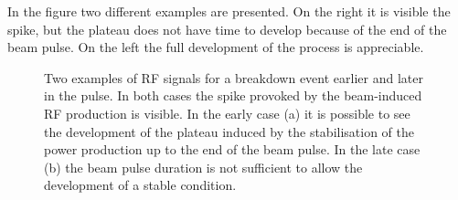 In the figure two different examples are presented. On the right it is visible the spike, but the plateau does not have time to develop because of the end of the beam pulse. On the left the full development of the process is appreciable.

\begin{figure}[h]
\centering
   \hspace{2mm}
\caption{Two examples of RF signals for a breakdown event earlier and later in the pulse. In both cases the spike provoked by the beam-induced RF production is visible. In the early case (a) it is possible to see the development of the plateau induced by the stabilisation of the power production up to the end of the beam pulse. In the late case (b) the beam pulse duration is not sufficient to allow the development of a stable condition.}
 \label{BI_rf_fig}
 \end{figure}


